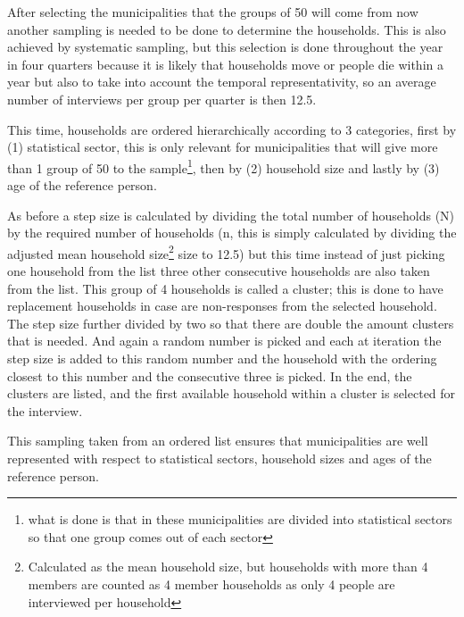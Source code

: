 After selecting the municipalities that the groups of 50 will come from now another sampling is needed to be done to determine the households. This is also achieved by systematic sampling, but this selection is done throughout the year in four quarters because it is likely that households move or people die within a year but also to take into account the temporal representativity, so an average number of interviews per group per quarter is then 12.5.

This time, households are ordered hierarchically according to 3 categories, first by (1) statistical sector, this is only relevant for municipalities that will give more than 1 group of 50 to the 
sample\footnote{what is done is that in these municipalities are divided into statistical sectors so that one group comes out of each sector}, then by (2) household size and lastly by (3) age of the reference person.

As before a step size is calculated by dividing the total number of households (N) by the required number of households (n, this is simply calculated by dividing the adjusted mean household size\footnote{Calculated as the mean household size, but households with more than 4 members are counted as 4 member households as only 4 people are interviewed per household} size to 12.5) but this time instead of just picking one household from the list three other consecutive households are also taken from the list. This group of 4 households is called a cluster; this is done to have replacement households in case are non-responses from the selected household. The step size further divided by two so that there are double the amount clusters that is needed. And again a random number is picked and each at iteration the step size is added to this random number and the household with the ordering closest to this number and the consecutive three is picked. In the end, the clusters are listed, and the first available household within a cluster is selected for the interview.

This sampling taken from an ordered list ensures that municipalities are well represented with respect to statistical sectors, household sizes and ages of the reference person. 

